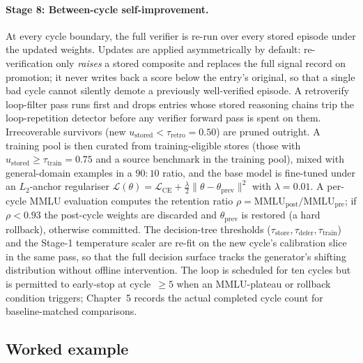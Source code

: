 \paragraph{Stage 8: Between-cycle self-improvement.}
At every cycle boundary, the full verifier is re-run over every stored episode under the updated weights. Updates are applied asymmetrically by default: re-verification only \emph{raises} a stored composite and replaces the full signal record on promotion; it never writes back a score below the entry's original, so that a single bad cycle cannot silently demote a previously well-verified episode. A retroverify loop-filter pass runs first and drops entries whose stored reasoning chains trip the loop-repetition detector before any verifier forward pass is spent on them. Irrecoverable survivors (new $u_{\text{stored}} < \tau_{\text{retro}} = 0.50$) are pruned outright. A training pool is then curated from training-eligible stores (those with $u_{\text{stored}} \geq \tau_{\text{train}} = 0.75$ and a source benchmark in the training pool), mixed with general-domain examples in a $90{:}10$ ratio, and the base model is fine-tuned under an $L_{2}$-anchor regulariser $\mathcal{L}(\theta) = \mathcal{L}_{\text{CE}} + \tfrac{\lambda}{2}\|\theta - \theta_{\text{prev}}\|^{2}$ with $\lambda = 0.01$. A per-cycle MMLU evaluation computes the retention ratio $\rho = \mathrm{MMLU}_{\text{post}}/\mathrm{MMLU}_{\text{pre}}$; if $\rho < 0.93$ the post-cycle weights are discarded and $\theta_{\text{prev}}$ is restored (a hard rollback), otherwise committed. The decision-tree thresholds ($\tau_{\text{store}}, \tau_{\text{defer}}, \tau_{\text{train}}$) and the Stage-1 temperature scaler are re-fit on the new cycle's calibration slice in the same pass, so that the full decision surface tracks the generator's shifting distribution without offline intervention. The loop is scheduled for ten cycles but is permitted to early-stop at cycle~$\geq 5$ when an MMLU-plateau or rollback condition triggers; Chapter~5 records the actual completed cycle count for baseline-matched comparisons.

\subsection{Worked example}
\label{sec:walkthrough}


